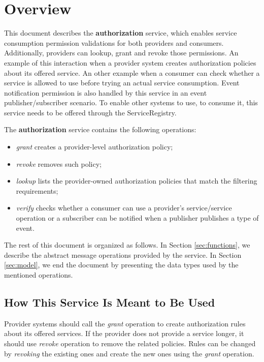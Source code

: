 \documentclass[a4paper]{arrowhead}
\begin{document}
\section{Overview}
\label{sec:overview}
This document describes the \textbf{authorization} service, which enables service consumption permission validations for both providers and consumers.  Additionally, providers can lookup, grant and revoke those permissions. An example of this interaction when a provider system creates authorization policies about its offered service. An other example when a consumer can check whether a service is allowed to use before trying an actual service consumption. Event notification permission is also handled by this service in an event publisher/subscriber scenario. To enable other systems to use, to consume it, this service needs to be offered through the ServiceRegistry.

The \textbf{authorization} service contains the following operations:

\begin{itemize}
    \item \textit{grant} creates a provider-level authorization policy;
    \item \textit{revoke} removes such policy;
    \item \textit{lookup} lists the provider-owned authorization policies that match the filtering requirements;
    \item \textit{verify} checks whether a consumer can use a provider's service/service operation or a subscriber can be notified when a publisher publishes a type of event.
\end{itemize}

The rest of this document is organized as follows.
In Section \ref{sec:functions}, we describe the abstract message operations provided by the service.
In Section \ref{sec:model}, we end the document by presenting the data types used by the mentioned operations.

\subsection{How This Service Is Meant to Be Used}
Provider systems should call the \textit{grant} operation to create authorization rules about its offered services. If the provider does not provide a service longer, it should use \textit{revoke} operation to remove the related policies. Rules can be changed by \textit{revoking} the existing ones and create the new ones using the \textit{grant} operation.
\end{document}
